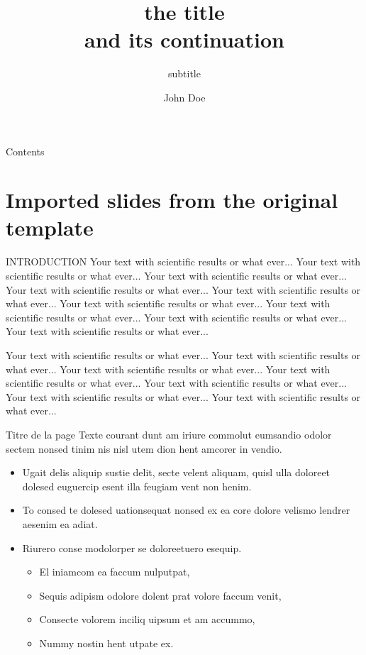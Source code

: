 \documentclass[9pt]{beamer}
\author{John Doe}
\title[SHORTITLE]{the title \\[2mm] and its continuation}
\subtitle{subtitle}
\begin{document}

\begin{frame}[plain]
\titlepage
\end{frame}

\begin{frame}{\textcolor{inriaGrey}{Contents}}
  \tableofcontents
\end{frame}

 
\section{Imported slides from the original template}


\begin{frame}{INTRODUCTION}
	Your text with scientific results or what ever... Your text with
scientific results or what ever... Your text with scientific results or
what ever... Your text with scientific results or what ever... Your
text with scientific results or what ever... Your text with scientific
results or what ever... Your text with scientific results or what
ever... Your text with scientific results or what ever... Your text
with scientific results or what ever...

Your text with scientific results or what ever... Your text with
scientific results or what ever... Your text with scientific results or
what ever... Your text with scientific results or what ever... Your
text with scientific results or what ever... Your text with scientific
results or what ever... Your text with scientific results or what
ever...
\end{frame}


\begin{frame}{Titre de la page}
Texte courant dunt am iriure commolut eumsandio odolor sectem
nonsed tinim nis nisl utem dion hent amcorer in vendio.

\begin{itemize}
\item Ugait delis aliquip sustie delit, secte velent aliquam, quisl ulla
  doloreet dolesed euguercip esent illa feugiam vent non henim.
\item To consed te dolesed uationsequat nonsed ex ea core dolore
velismo lendrer aesenim ea adiat.
\item Riurero conse modolorper se doloreetuero esequip.
  \begin{itemize}
  \item El iniamcom ea faccum nulputpat,
  \item Sequis adipism odolore dolent prat volore faccum venit,
  \item Consecte volorem inciliq uipsum et am accummo,
  \item Nummy nostin hent utpate ex.
  \end{itemize}
\end{itemize}
\end{frame}
\end{document}
